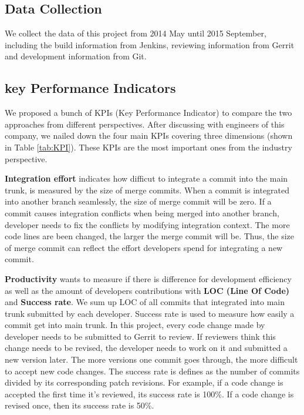 \subsection{Data Collection}
We collect the data of this project from 2014 May until 2015 September, including the build information from Jenkins, reviewing information from Gerrit and development information from Git. 


\subsection{key Performance Indicators}
We proposed a bunch of KPIs (Key Performance Indicator) to compare the two approaches from different perspectives. After discussing with engineers of this company, we nailed down the four main KPIs covering three dimensions (shown in Table \ref{tab:KPI}). These KPIs are the most important ones from the industry perspective.


\textbf{Integration effort} indicates how difficut to integrate a commit into the main trunk, is measured by the size of merge commits. When a commit is integrated into another branch seamlessly, the size of merge commit will be zero. If a commit causes integration conflicts when being merged into another branch, developer needs to fix the conflicts by modifying integration context. The more code lines are been changed, the larger the merge commit will be. Thus, the size of merge commit can reflect the effort developers spend for integrating a new commit.



\textbf{Productivity} wants to measure if there is difference for development efficiency as well as the amount of developers contributions with \textbf{LOC (Line Of Code)} and \textbf{Success rate}. We sum up LOC of all commits that integrated into main trunk submitted by each developer. Success rate is used to measure how easily a commit get into main trunk. In this project, every code change made by developer needs to be submitted to Gerrit to review. If reviewers think this change needs to be revised, the developer needs to work on it and submitted a new version later. The more versions one commit goes through, the more difficult to accept new code changes. The success rate is defines as the number of commits divided by its corresponding patch revisions. For example, if a code change is accepted the first time it's reviewed, its success rate is 100\%. If a code change is revised once, then its success rate is 50\%.


